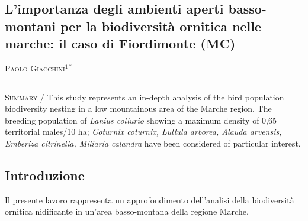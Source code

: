\setcounter{figure}{0}
\setcounter{table}{0}

\begin{adjustwidth}{-3.5cm}{0cm}
\pagestyle{CIOpage}
\chapter*[Diversit\`a ornitica basso-montana di Fiordimonte (MC -
Marche)]{\bfseries
L{\textquoteright}importanza degli ambienti aperti basso-montani per la
biodiversit\`a ornitica nelle marche: il caso di Fiordimonte (MC)}

\textsc{Paolo Giacchini}$^{1*}$ \\

\noindent\color{MUSEBLUE}\rule{27cm}{2pt}
\vspace{1cm}
\end{adjustwidth}



{\small
\noindent \textsc{\color{MUSEBLUE} Summary} / This study represents an in-depth analysis of the bird population
biodiversity nesting in a low mountainous area of the Marche region.
The breeding population of \textit{Lanius collurio} showing a maximum
density of 0,65 territorial males/10 ha; \textit{Coturnix coturnix,
Lullula arborea, Alauda arvensis, Emberiza citrinella, Miliaria
calandra} have been considered of particular interest.
}



\section*{Introduzione}

Il presente lavoro rappresenta un approfondimento
dell{\textquoteright}analisi della biodiversit\`a ornitica nidificante
in un{\textquoteright}area basso-montana della regione Marche.

